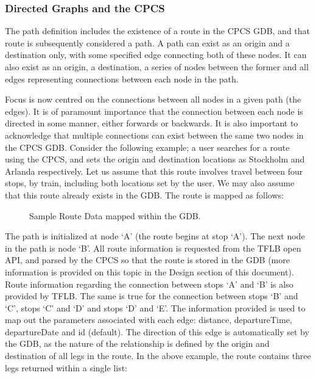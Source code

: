 \documentclass[12pt]{article}   	%
\begin{document}
\subsubsection{Directed Graphs and the CPCS}
The path definition includes the existence of a route in the CPCS GDB, and that route is subsequently considered a path. A path can exist as an origin and a destination only, with some specified edge connecting both of these nodes. It can also exist as an origin, a destination, a series of nodes between the former and all edges representing connections between each node in the path.

Focus is now centred on the connections between all nodes in a given path (the edges). It is of paramount importance that the connection between each node is directed in some manner, either forwards or backwards. It is also important to acknowledge that multiple connections can exist between the same two nodes in the CPCS GDB. Consider the following example; a user searches for a route using the CPCS, and sets the origin and destination locations as Stockholm and Arlanda respectively. Let us assume that this route involves travel between four stops, by train, including both locations set by the user. We may also assume that this route already exists in the GDB. The route is mapped as follows:

\noindent
\hfill
\begin{figure}[htp]

\caption{Sample Route Data mapped within the GDB.}
\end{figure}
\hfill

\noindent
The path is initialized at node ‘A’ (the route begins at stop ‘A’). The next node in the path is node ‘B’. All route information is requested from the TFLB open API, and parsed by the CPCS so that the route is stored in the GDB (more information is provided on this topic in the Design section of this document). Route information regarding the connection between stops ‘A’ and ‘B’ is also provided by TFLB. The same is true for the connection between stops ‘B’ and ‘C’, stops ‘C’ and ‘D’ and stops ‘D’ and ‘E’. The information provided is used to map out the parameters associated with each edge: distance, departureTime, departureDate and id (default). The direction of this edge is automatically set by the GDB, as the nature of the relationship is defined by the origin and destination of all legs in the route. In the above example, the route contains three legs returned within a single list:
\end{document}
